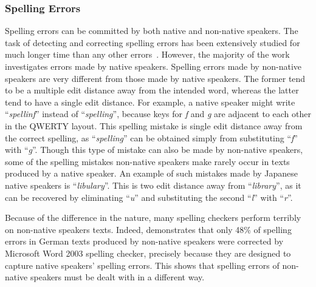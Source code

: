 \documentclass[11pt]{article}
\begin{document}
\subsubsection{Spelling Errors}
Spelling errors can be committed by both native and non-native speakers. The task of 
detecting and correcting spelling errors has been extensively studied for much 
longer time than any other errors~\citep{heift2007errors}. However, the majority 
of the work investigates errors made by native speakers. Spelling errors made by 
non-native speakers are very different from those made by native speakers. The 
former tend to be a multiple edit distance away from the intended word, whereas 
the latter tend to have a single edit distance. For example, a native speaker 
might write ``{\em *spellinf}'' instead of ``{\em spelling}'', because keys for {\em f} and {\em g} are 
adjacent to each other in the QWERTY layout. This spelling mistake is single 
edit distance away from the correct spelling, as ``{\em spelling}'' can be obtained 
simply from substituting ``{\em f}'' with ``{\em g}''. Though this type of mistake can also 
be made by non-native speakers, some of the spelling mistakes non-native 
speakers make rarely occur in texts produced by a native speaker. An example of 
such mistakes made by Japanese native speakers is ``{\em *libulary}''. This is two 
edit distance away from ``{\em library}'', as it can be recovered by eliminating ``{\em u}'' 
and substituting the second ``{\em l}'' with ``{\em r}''. 

Because of the difference in the nature, many spelling checkers perform terribly 
on non-native speakers texts. Indeed, \cite{rimrott2005language} demonstrates 
that only 48\% of spelling errors in German texts produced by non-native 
speakers were corrected by Microsoft Word 2003 spelling checker, precisely 
because they are designed to capture native speakers' spelling errors. This shows 
that spelling errors of non-native speakers must be dealt with in a different way. 
\end{document}
